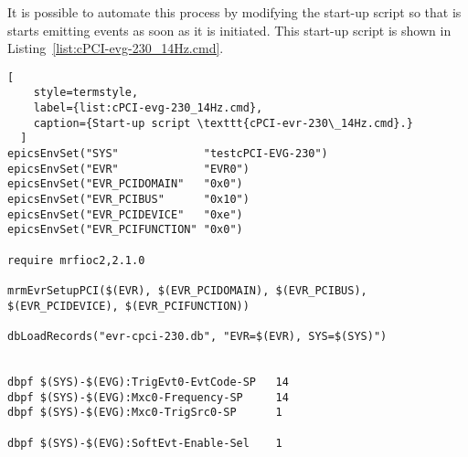\documentclass[11pt
  , a4paper
  , article
  , oneside
  , showtrims
]{memoir}
\begin{document}
It is possible to automate this process by modifying the start-up script so that is starts emitting events as soon as it is initiated. This start-up script is shown in Listing~\ref{list:cPCI-evg-230_14Hz.cmd}.
\begin{lstlisting}[ 
    style=termstyle,
    label={list:cPCI-evg-230_14Hz.cmd},
    caption={Start-up script \texttt{cPCI-evr-230\_14Hz.cmd}.}
  ]
epicsEnvSet("SYS"             "testcPCI-EVG-230")
epicsEnvSet("EVR"             "EVR0")
epicsEnvSet("EVR_PCIDOMAIN"   "0x0")
epicsEnvSet("EVR_PCIBUS"      "0x10")
epicsEnvSet("EVR_PCIDEVICE"   "0xe")
epicsEnvSet("EVR_PCIFUNCTION" "0x0")

require mrfioc2,2.1.0

mrmEvrSetupPCI($(EVR), $(EVR_PCIDOMAIN), $(EVR_PCIBUS), $(EVR_PCIDEVICE), $(EVR_PCIFUNCTION))

dbLoadRecords("evr-cpci-230.db", "EVR=$(EVR), SYS=$(SYS)")


dbpf $(SYS)-$(EVG):TrigEvt0-EvtCode-SP   14
dbpf $(SYS)-$(EVG):Mxc0-Frequency-SP     14
dbpf $(SYS)-$(EVG):Mxc0-TrigSrc0-SP      1

dbpf $(SYS)-$(EVG):SoftEvt-Enable-Sel    1
  
\end{lstlisting}

\clearpage
\backmatter
%
%
%

%

\end{document}
